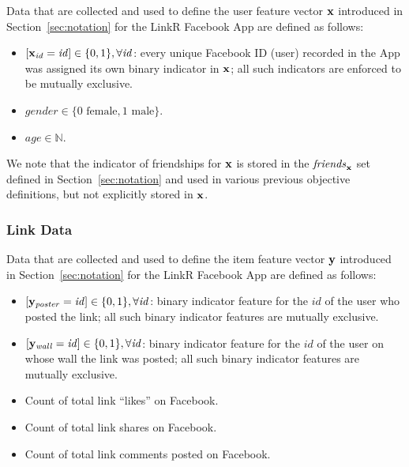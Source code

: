 Data that are collected and used to define the user feature vector
$\mathbf{x}$ introduced in Section~\ref{sec:notation} for the LinkR Facebook
App are defined as follows:
\begin{itemize}
\item $[\mathbf{x}_\mathit{id} = \mathit{id}] \in \{ 0, 1 \}, \forall \mathit{id}$: 
every unique Facebook ID (user) recorded in the App was assigned its own
binary indicator in $\mathbf{x}$; all such indicators are enforced to be
mutually exclusive.
\item $\mathit{gender} \in \{ 0 \mbox{ female}, 1 \mbox{ male} \}$.
\item $\mathit{age} \in \mathbb{N}$.
\end{itemize}
We note that the indicator of friendships for $\mathbf{x}$ is stored in the
$\mathit{friends}_{\mathbf{x}}$ set defined in Section~\ref{sec:notation} and
used in various previous objective definitions, but not explicitly 
stored in $\mathbf{x}$.

\subsubsection{Link Data}

Data that are collected and used to define the item feature vector
$\mathbf{y}$ introduced in Section~\ref{sec:notation} for the LinkR Facebook
App are defined as follows:
\begin{itemize}
\item $[\mathbf{y}_\mathit{poster} = \mathit{id}] \in \{ 0, 1 \}, \forall \mathit{id}$:  
binary indicator feature for the $\mathit{id}$ of the user who posted the link;
all such binary indicator features are mutually exclusive.
\item $[\mathbf{y}_\mathit{wall} = \mathit{id}] \in \{ 0, 1 \}, \forall \mathit{id}$:
binary indicator feature for the $\mathit{id}$ of the user on whose wall the link was posted; all such binary indicator features are mutually exclusive.
\item Count of total link ``likes'' on Facebook.
\item Count of total link shares on Facebook.
\item Count of total link comments posted on Facebook.
\end{itemize}

